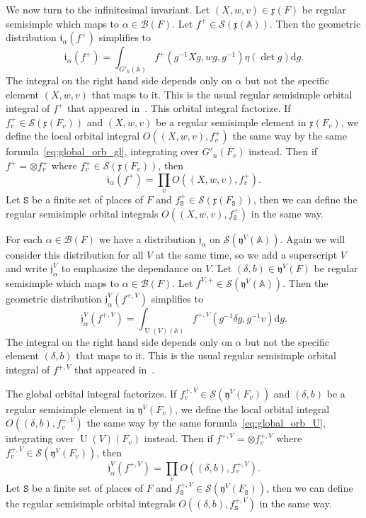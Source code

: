\documentclass[letterpaper,11pt]{amsart}
\newcommand{\fx}{\mathfrak{x}}
\newcommand{\fy}{\mathfrak{y}}
\newcommand{\bA}{\mathbb{A}}
\newcommand{\cB}{\mathcal{B}}
\newcommand{\cS}{\mathcal{S}}
\newcommand{\rd}{\mathrm{d}}
\newcommand{\tS}{\mathtt{S}}
\newcommand{\<}{\negthickspace}
\DeclareMathOperator{\U}{U}
\theoremstyle{definition}
\theoremstyle{plain}
\theoremstyle{remark}
\numberwithin{equation}{section}
\begin{document}
We now turn to the infinitesimal invariant. Let $(X, w, v) \in \fx(F)$ be
regular semisimple which maps to $\alpha \in \cB(F)$. Let $f^+ \in
\cS(\fx(\bA))$. Then the geometric distribution
$\mathfrak{i}_{\alpha}(f^+)$ simplifies to
    \begin{equation}    \label{eq:global_orb_gl}
    \mathfrak{i}_{\alpha}(f^+) = \int_{G'_n(\bA)}
    f^+(g^{-1}X g, w g, g^{-1} )
    \eta(\det g) \rd g.
    \end{equation}
The integral on the right hand side depends only on $\alpha$ but not the
specific element $(X, w,v)$ that maps to it. This is the usual regular
semisimple orbital integral of $f^+$ that appeared in~\cites{CZ,Zhang1}. This
orbital integral factorize. If $f_{v}^+ \in \cS(\fx(F_v))$ and $(X, w, v)$
be a regular semisimple element in $\fx(F_v)$, we define the local orbital
integral $O((X, w, v), f_{v}^+)$ the same way by the same
formula~\eqref{eq:global_orb_gl}, integrating over $G'_n(F_v)$ instead. Then
if $f^+ = \otimes f_{v}^+$ where $f_{v}^+ \in \cS(\fx(F_v))$, then
    \[
    \mathfrak{i}_{\alpha}(f^+) = \prod_v O((X, w, v), f_{v}^+).
    \]
Let $\tS$ be a finite set of places of $F$ and $f_{\tS}^+ \in
\cS(\fx(F_\tS))$, then we can define the regular semisimple orbital
integrals $O((X, w, v), f_{\tS}^+)$ in the same way.

For each $\alpha \in \cB(F)$ we have a distribution $\mathfrak{j}_{\alpha}$
on $\cS(\fy^V(\bA))$. Again we will consider this distribution for all $V$ at
the same time, so we add a superscript $V$ and write
$\mathfrak{j}_{\alpha}^V$ to emphasize the dependance on $V$. Let $(\delta,
b) \in \fy^V(F)$ be regular semisimple which maps to $\alpha \in \cB(F)$. Let
$f^{V,+} \in \cS(\fy^V(\bA))$. Then the geometric distribution
$\mathfrak{j}^V_{\alpha}(f^{+,V})$ simplifies to
    \[
    \mathfrak{j}^V_{\alpha}(f^{+, V}) = \int_{\U(V)(\bA)}
    f^{+, V} (g^{-1} \delta g, g^{-1} v) \rd g.
    \]
The integral on the right hand side depends only on $\alpha$ but not the
specific element $(\delta,b)$ that maps to it. This is the usual regular
semisimple orbital integral of $f^{+, V}$ that appeared in~\cites{CZ,Zhang1}.

The global orbital integral factorizes. If $f^{+,V}_{v} \in \cS(\fy^V(F_v))$
and $(\delta, b)$ be a regular semisimple element in $\fy^V(F_v)$, we define
the local orbital integral $O((\delta,b), f^{+, V}_{v})$ the same way by the
same formula~\eqref{eq:global_orb_U}, integrating over $\U(V)(F_v)$ instead.
Then if $f^{+, V} = \otimes f^{+, V}_{v}$ where $f^{+, V}_{v} \in
\cS(\fy^V(F_v))$, then
    \[
    \mathfrak{j}^V_{\alpha}(f^{+,V}) = \prod_v O((\delta, b), f^{+, V}_{v}).
    \]
Let $\tS$ be a finite set of places of $F$ and $f^{+, V}_{\tS} \in
\cS(\fy^V(F_{\tS}))$, then we can define the regular semisimple orbital
integrals $O((\delta, b), f^{+, V}_{\tS})$ in the same way.
\end{document}
